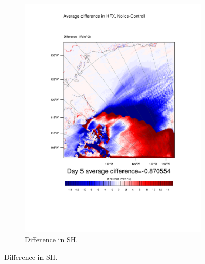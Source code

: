 \begin{figure}
\begin{subfigure}{0.48\textwidth}
		\includegraphics[width=\textwidth]{results/noice/diff_NoIce_HFX_Day5.pdf}
		\caption{Difference in SH.}
		\label{subfig:sh_r2Day5}
	\end{subfigure}
	

\end{figure}
